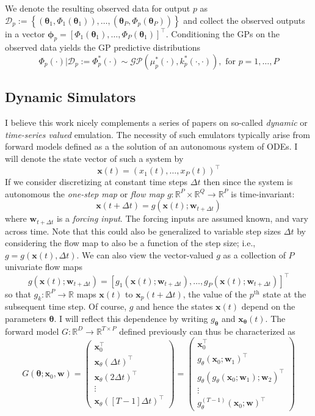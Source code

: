 \documentclass[12pt]{article}
\newcommand{\R}{\mathbb{R}}
\newcommand{\btheta}{\boldsymbol{\theta}}
\newcommand{\bx}{\mathbf{x}}
\newcommand{\bw}{\mathbf{w}}
\begin{document}
We denote the resulting observed data for output $p$ as 
$\mathcal{D}_p := \left\{(\btheta_1, \Phi_1(\btheta_1)), \dots, (\btheta_P, \Phi_p(\btheta_P))  \right\}$ and collect the observed outputs in a vector 
$\boldsymbol{\phi}_p = \left[\Phi_1(\btheta_1), \dots, \Phi_P(\btheta_1) \right]^{\top}$. Conditioning the GPs on the observed data yields the GP predictive distributions 
\[\Phi_p(\cdot)|\mathcal{D}_p := \Phi_p^*(\cdot) \sim \mathcal{GP}(\mu^*_p(\cdot), k_p^*(\cdot, \cdot)), \text{ for } p = 1, \dots, P\]

\subsection{Dynamic Simulators}
I believe this work nicely complements a series of papers on so-called \textit{dynamic} or \textit{time-series valued} emulation. The necessity of such emulators typically arise from forward models 
defined as a the solution of an autonomous system of ODEs. I will denote the state vector of such a system by 
\[\bx(t) = \left(x_1(t), \dots, x_P(t) \right)^{\top} \]
If we consider discretizing at constant time steps $\Delta t$ then since the system is autonomous the \textit{one-step map} or \textit{flow map} $g: \R^P \times \R^Q \to \R^P$ is time-invariant: 
 \[\bx(t + \Delta t) = g(\bx(t); \bw_{t + \Delta t})\]
 where $\bw_{t + \Delta t}$ is a \textit{forcing input}. The forcing inputs are assumed known, and vary across time. 
 Note that this could also be generalized to variable step sizes $\Delta t$ by considering the flow map to also be a function of the step size; i.e., $g = g(\bx(t), \Delta t)$. We can also view the 
 vector-valued $g$ as a collection of $P$ univariate flow maps
 \[g(\bx(t); \bw_{t + \Delta t}) = \left[g_1(\bx(t); \bw_{t + \Delta t}), \dots, g_P(\bx(t); \bw_{t + \Delta t}) \right]^{\top}\]
 so that $g_k: \R^P \to \R$ maps $\bx(t)$ to $\bx_p(t + \Delta t)$, the value of the $p^{\text{th}}$ state at the subsequent time step. Of course, $g$ and hence the states $\bx(t)$ depend on 
 the parameters $\btheta$. I will reflect this dependence by writing $g_{\btheta}$ and $\bx_{\btheta}(t)$. The forward model $G: \R^D \to \R^{T \times P}$ defined previously can thus be characterized 
 as 
 \[
 G(\btheta; \bx_0, \bw) = \begin{pmatrix} \bx_0^{\top} \\ \bx_\theta(\Delta t)^{\top} \\  \bx_\theta(2\Delta t)^{\top} \\ \vdots \\ \bx_\theta\left([T-1]\Delta t\right)^{\top} \end{pmatrix} = 
 \begin{pmatrix} \bx_0^{\top} \\ g_\theta(\bx_0; \bw_1)^{\top} \\  g_\theta\left(g_\theta(\bx_0; \bw_1); \bw_2 \right)^{\top} \\ \vdots \\ g_\theta^{(T-1)}(\bx_0; \bw)^{\top} \end{pmatrix}
 \]
\end{document}
